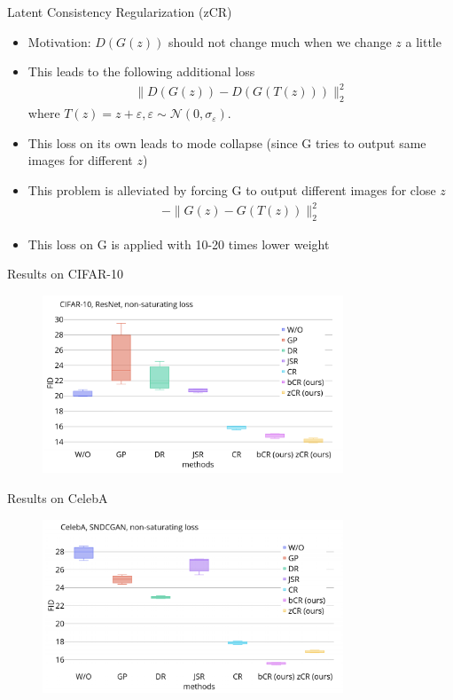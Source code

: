 \documentclass[handout, 10pt]{beamer}
\begin{document}
\begin{frame}{Latent Consistency Regularization (zCR)}
\begin{itemize}
    \item\pause Motivation: $D(G(z))$ should not change much when we change $z$ a little
    \item\pause This leads to the following additional loss
    \begin{align*}
        \| D(G(z)) - D(G(T(z))) \|_2^2
    \end{align*}
    where $T(z) = z + \varepsilon, \varepsilon \sim \mathcal{N}(0, \sigma_\varepsilon)$.
    \item\pause This loss on its own leads to mode collapse (since G tries to output same images for different $z$)
    \item\pause This problem is alleviated by forcing G to output different images for close $z$
    \begin{align*}
        - \| G(z) - G(T(z)) \|_2^2
    \end{align*}
    \item\pause This loss on G is applied with 10-20 times lower weight
\end{itemize}
\end{frame}


\begin{frame}{Results on CIFAR-10}
\begin{figure}
\centering
\includegraphics[width=0.8\textwidth]{images/cifar10-results.png}
\end{figure}
\end{frame}


\begin{frame}{Results on CelebA}
\begin{figure}
\centering
\includegraphics[width=0.8\textwidth]{images/celeba-results.png}
\end{figure}
\end{frame}
\end{document}
